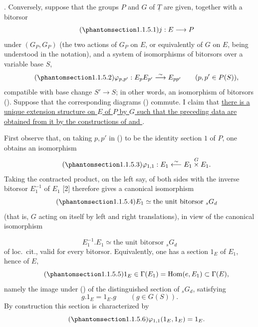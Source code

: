 
. Conversely, suppose that the groups $P$ and $G$ of
$\underline T$ are given, together with a bitorsor
\begin{equation}\tag{\SGARefTarget{sga7.sga7i.evii.n1-1-5-1}{1.1.5.1}}
 j:E\longrightarrow P
\end{equation}
under $(G_P,G_P)$ (the two actions of $G_P$ on $E$, or equivalently of
$G$ on $E$, being understood in the notation), and a system of
isomorphisms of bitorsors over a variable base $S$,
\begin{equation}\tag{\SGARefTarget{sga7.sga7i.evii.n1-1-5-2}{1.1.5.2}}
 \varphi_{p,p'}:E_pE_{p'}\overset{\sim}{\longrightarrow}E_{pp'}
 \qquad (p,p'\in P(S)),
\end{equation}
compatible with base change $S'\longrightarrow S$; in other words, an
isomorphism of bitorsors (). Suppose that the corresponding
diagrams () commute. I claim that \underline{there is a unique
extension structure on $E$ of $P$ by $G$ such that the preceding data
are obtained from it by the constructions of  and }.

First observe that, on taking $p,p'$ in () to be the identity
section $1$ of $P$, one obtains an isomorphism
\begin{equation}\tag{\SGARefTarget{sga7.sga7i.evii.n1-1-5-3}{1.1.5.3}}
 \varphi_{1,1}:E_1\overset{\sim}{\longleftarrow}
 E_1\mathbin{\overset{G}{\times}}E_1.
\end{equation}
Taking the contracted product, on the left say, of both sides with the
inverse bitorsor $E_1^{-1}$ of $E_1$ [2] therefore gives a canonical
isomorphism
\begin{equation}\tag{\SGARefTarget{sga7.sga7i.evii.n1-1-5-4}{1.1.5.4}}
 E_1\simeq\text{the unit bitorsor }{}_sG_d
\end{equation}
(that is, $G$ acting on itself by left and right translations), in view
of the canonical isomorphism


\[
 E_1^{-1}.E_1\simeq\text{the unit bitorsor }{}_sG_d
\]
of loc.~cit., valid for every bitorsor. Equivalently, one has a section
$1_E$ of $E_1$, hence of $E$,
\begin{equation}\tag{\SGARefTarget{sga7.sga7i.evii.n1-1-5-5}{1.1.5.5}}
 1_E\in\Gamma(E_1)=\operatorname{Hom}(e,E_1)\subset\Gamma(E),
\end{equation}
namely the image under () of the distinguished section of
${}_sG_d$, satisfying
\[
 g.1_E=1_E.g\qquad(g\in G(S)).
\]
By construction this section is characterized by
\begin{equation}\tag{\SGARefTarget{sga7.sga7i.evii.n1-1-5-6}{1.1.5.6}}
 \varphi_{1,1}(1_E,1_E)=1_E.
\end{equation}

